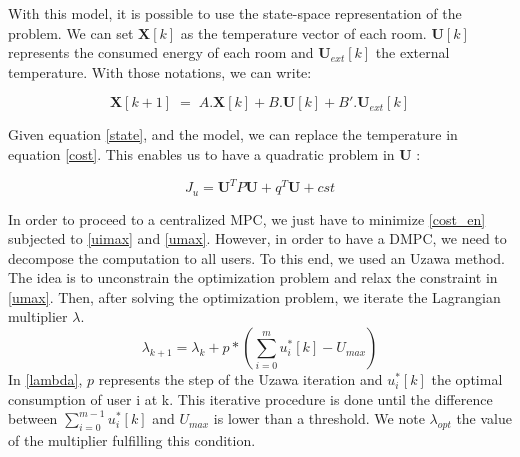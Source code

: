 \documentclass[conference]{IEEEtran}
\begin{document}
With this model, it is possible to use the state-space representation of the problem. We can  set $\bm{X}[k]$ as the temperature vector of each room. $\bm{U}[k]$ represents the consumed energy of each room and $\bm{U}_{ext}[k]$ the external temperature. 
With those notations, we can write:

\begin{equation}
\bm{X}[k+1]\; = \; A . \bm{X}[k] + B .\bm{U}[k] + B'.\bm{U}_{ext}[k]
\label{state}
\end{equation}

Given equation \ref{state}, and the model, we can replace the temperature in equation \ref{cost}. This enables us to have a quadratic problem in $\bm{U}$ :

\begin{equation}
J_u = \bm{U}^T P \bm{U} + q^T \bm{U} + cst 
\label{cost_en}
\end{equation}

In order to proceed to a centralized MPC, we just have to minimize \ref{cost_en} subjected to \ref{uimax} and \ref{umax}. However, in order to have a DMPC, we need to decompose the computation to all users. To this end, we used an Uzawa method. The idea is to unconstrain  the optimization problem and relax the constraint in \ref{umax}. Then, after solving the optimization problem, we iterate the Lagrangian multiplier $\lambda$.
\begin{equation}
\lambda_{k+1} = \lambda_k + p * (\sum_{i=0}^m u_i^*[k] - U_{max})
\label{lambda}
\end{equation}
In \ref{lambda}, $p$ represents the step of the Uzawa iteration and $u_i^*[k]$ the optimal consumption of user i at k. This iterative procedure is done until the difference between $\sum_{i=0}^{m-1} u_i^*[k]$ and  $U_{max}$ is lower than a threshold. We note $\lambda_{opt}$ the value of the multiplier fulfilling this condition.
\end{document}
